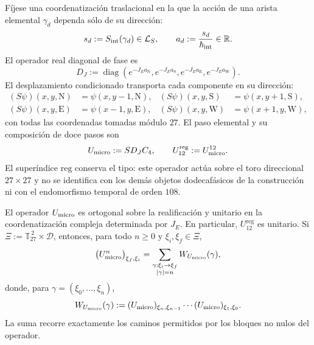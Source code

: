 Fíjese una coordenatización traslacional en la que la acción de una arista elemental
\(\gamma_d\) dependa sólo de su dirección:
\[
 s_d:=S_{\rm int}(\gamma_d)\in\mathcal L_S,
 \qquad
 a_d:=\frac{s_d}{\hbar_{\rm int}}\in\mathbb R.
\]
El operador real diagonal de fase es
\[
 D_J:=\operatorname{diag}
 \left(
  e^{-J_Ea_{\mathrm N}},
  e^{-J_Ea_{\mathrm S}},
  e^{-J_Ea_{\mathrm E}},
  e^{-J_Ea_{\mathrm W}}
 \right).
\]
El desplazamiento condicionado transporta cada componente en su dirección:
\begin{align*}
 (S\psi)(x,y,\mathrm N)&=\psi(x,y-1,\mathrm N),&
 (S\psi)(x,y,\mathrm S)&=\psi(x,y+1,\mathrm S),\\
 (S\psi)(x,y,\mathrm E)&=\psi(x-1,y,\mathrm E),&
 (S\psi)(x,y,\mathrm W)&=\psi(x+1,y,\mathrm W),
\end{align*}
con todas las coordenadas tomadas módulo \(27\). El paso elemental y su
composición de doce pasos son
\begin{equation}
 U_{\rm micro}:=S D_J C_4,
 \qquad
 U_{12}^{\mathrm{reg}}:=U_{\rm micro}^{12}.
 \label{eq:paso-unitario-registro-27-rev3}
\end{equation}
El superíndice \(\mathrm{reg}\) conserva el tipo: este operador actúa sobre
el toro direccional \(27\times27\) y no se identifica con los demás objetos
dodecafásicos de la construcción ni con el endomorfismo temporal de orden \(108\).

\begin{proposition}
\label{prop:unitariedad-suma-registro-27-rev3}
El operador \(U_{\rm micro}\) es ortogonal sobre la realificación y unitario
en la coordenatización compleja determinada por \(J_E\). En particular,
\(U_{12}^{\mathrm{reg}}\) es unitario. Si
\(\Xi:=\mathbb T_{27}^{\,2}\times\mathcal D\), entonces, para todo
\(n\geq0\) y \(\xi_i,\xi_f\in\Xi\),
\[
 \bigl(U_{\rm micro}^{n}\bigr)_{\xi_f,\xi_i}
 =
 \sum_{\substack{\gamma:\xi_i\to\xi_f\\|\gamma|=n}}
 W_{U_{\rm micro}}(\gamma),
\]
donde, para \(\gamma=(\xi_0,\ldots,\xi_n)\),
\[
 W_{U_{\rm micro}}(\gamma)
 :=
 (U_{\rm micro})_{\xi_n,\xi_{n-1}}
 \cdots
 (U_{\rm micro})_{\xi_1,\xi_0}.
\]
La suma recorre exactamente los caminos permitidos por los bloques no nulos
del operador.
\end{proposition}

